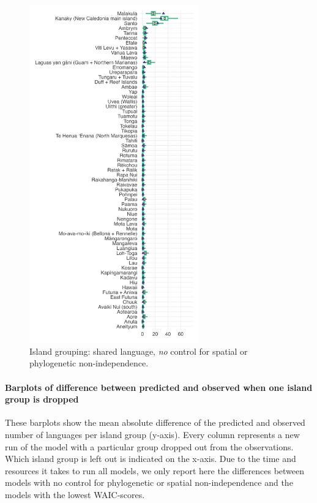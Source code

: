 \documentclass[unnumsec,webpdf,modern,medium]{oup-authoring-template}
\begin{document}
\begin{figure}[ht]
\includegraphics[width=0.65\textwidth]{brms_predict_medium_control_none.png
}
\caption{Island grouping: shared language,  \emph{no} control for spatial or phylogenetic non-independence.}
\label{brms_predict_medium_control_none}
\end{figure}

\FloatBarrier
\paragraph{Barplots of difference between predicted and observed when one island group is dropped}
\label{appendix_supp_figs_barplots_diff}

These barplots show the mean absolute difference of the predicted and observed number of languages per island group (y-axis). Every column represents a new run of the model with a particular group dropped out from the observations. Which island group is left out is indicated on the x-axis. Due to the time and resources it takes to run all models, we only report here the differences between models with no control for phylogenetic or spatial non-independence and the models with the lowest WAIC-scores.
\end{document}

